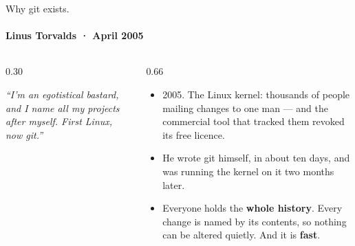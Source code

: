 \documentclass[aspectratio=169,10pt]{beamer}
\begin{document}
\begin{frame}{Why git exists.}
\framesubtitle{Linus Torvalds · April 2005}
\vspace*{\fill}
\begin{columns}[T]
\begin{column}{0.30\textwidth}
\vskip2.4mm
{\footnotesize\color{NovaBody}\emph{``I'm an egotistical bastard, and I name all my projects
after myself. First Linux, now git.''}\par}
\end{column}
\begin{column}{0.66\textwidth}
\vspace{2mm}
\begin{itemize}
  \item 2005. The Linux kernel: thousands of people mailing changes to one man — and the
    commercial tool that tracked them revoked its free licence.
  \item He wrote git himself, in about ten days, and was running the kernel on it two months
    later.
  \item Everyone holds the \textbf{whole history}. Every change is named by its contents, so
    nothing can be altered quietly. And it is \textbf{fast}.
\end{itemize}
\end{column}
\end{columns}
\vfill
\end{frame}
\end{document}
